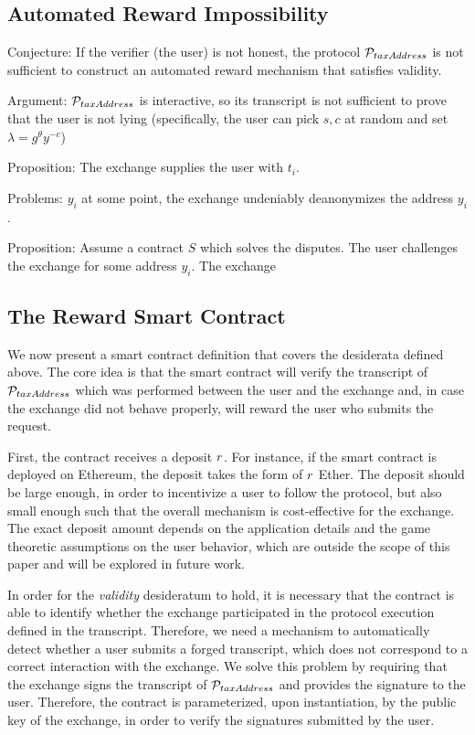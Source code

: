 \subsection{Automated Reward Impossibility}

Conjecture:
    If the verifier (\ie the user) is not honest, the protocol
    $\mathcal{P}_{taxAddress}$ is not sufficient to construct an automated reward
    mechanism that satisfies validity.

Argument:
    $\mathcal{P}_{taxAddress}$ is interactive, so its transcript is not sufficient
    to prove that the user is not lying (specifically, the user can pick $s, c$
    at random and set $\lambda = g^\theta y^{-c}$) 

Proposition:
    The exchange supplies the user with $t_i$.

Problems:
    $y_i$ at some point, \ie the exchange undeniably deanonymizes the address
    $y_i$.

Proposition:
    Assume a contract $S$ which solves the disputes. The user challenges the
    exchange for some address $y_i$. The exchange

\subsection{The Reward Smart Contract}\label{subsec:reward-contract}

We now present a smart contract definition that covers the desiderata defined
above. The core idea is that the smart contract will verify the transcript of
$\mathcal{P}_{taxAddress}$ which was performed between the user and the exchange
and, in case the exchange did not behave properly, will reward the user who
submits the request.

First, the contract receives a deposit $r$. For instance, if the smart
contract is deployed on Ethereum, the deposit takes the form of $r$
Ether. The deposit should be large enough, in order to incentivize a user to
follow the protocol, but also small enough such that the overall mechanism is
cost-effective for the exchange. The exact deposit amount depends on the
application details and the game theoretic assumptions on the user behavior,
which are outside the scope of this paper and will be explored in future work.

In order for the \emph{validity} desideratum to hold, it is necessary that the
contract is able to identify whether the exchange participated in the protocol
execution defined in the transcript. Therefore, we need a mechanism to
automatically detect whether a user submits a forged transcript, which does not
correspond to a correct interaction with the exchange. We solve this problem by
requiring that the exchange signs the transcript of $\mathcal{P}_{taxAddress}$ and
provides the signature to the user. Therefore, the contract is parameterized,
upon instantiation, by the public key of the exchange, in order to verify the
signatures submitted by the user.

